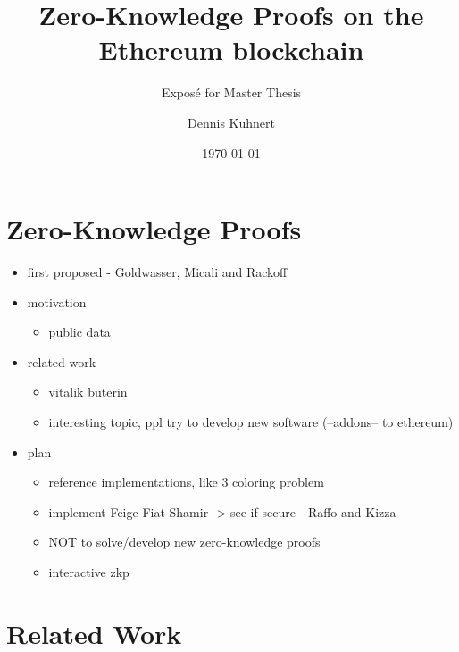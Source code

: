 \documentclass[a4paper]{scrartcl}
\title{Zero-Knowledge Proofs on the Ethereum blockchain}
\subtitle{Exposé for Master Thesis}
\author{Dennis Kuhnert}
\date{\today}
\begin{document}
\maketitle


\section{Zero-Knowledge Proofs}



\begin{itemize}
\item first proposed - Goldwasser, Micali and Rackoff \cite{goldwasser1989knowledge}
\item motivation
	\begin{itemize}
	\item public data
	\end{itemize}
\item related work
	\begin{itemize}
	\item vitalik buterin \cite{buterin2015public}
	\item interesting topic, ppl try to develop new software (--addons-- to ethereum)
	\end{itemize}
\item plan
	\begin{itemize}
	\item reference implementations, like 3 coloring problem
	\item implement Feige-Fiat-Shamir -> see if secure - Raffo and Kizza \cite{raffo2002digital, kizza2010feige}
	\item NOT to solve/develop new zero-knowledge proofs
	\item interactive zkp
	\end{itemize}
\end{itemize}

\section{Related Work}



\end{document}
